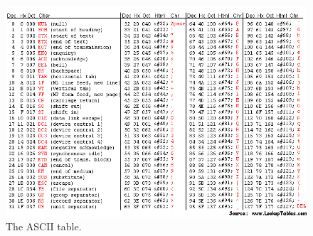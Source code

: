 \documentclass[8pt,a4paper,landscape,oneside]{amsart}
\begin{document}
\begin{multicols*}{3}
\end{multicols*}

\pagebreak

\begin{figure}[h]
\centering
 \includegraphics[scale=1]{ascii_table.png}
 \caption{The ASCII table.}
\end{figure}
\end{document}
